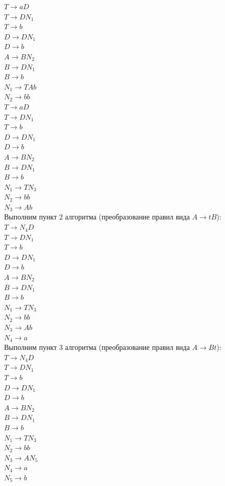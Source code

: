 \documentclass[a4paper,14pt]{extarticle}
\begin{document}
\begin{enumerate}[1.]
$T \rightarrow aD$\\
$T \rightarrow DN_1$\\
$T \rightarrow b$\\
$D \rightarrow DN_1$\\
$D \rightarrow b$\\
$A \rightarrow BN_2$\\
$B \rightarrow DN_1$\\
$B \rightarrow b$\\
$N_1 \rightarrow TAb$\\
$N_2 \rightarrow bb$\\

$T \rightarrow aD$\\
$T \rightarrow DN_1$\\
$T \rightarrow b$\\
$D \rightarrow DN_1$\\
$D \rightarrow b$\\
$A \rightarrow BN_2$\\
$B \rightarrow DN_1$\\
$B \rightarrow b$\\
$N_1 \rightarrow TN_3$\\
$N_2 \rightarrow bb$\\
$N_3 \rightarrow Ab$\\

Выполним пункт 2 алгоритма (преобразование правил вида $A \rightarrow tB$):\\
$T \rightarrow N_4D$\\
$T \rightarrow DN_1$\\
$T \rightarrow b$\\
$D \rightarrow DN_1$\\
$D \rightarrow b$\\
$A \rightarrow BN_2$\\
$B \rightarrow DN_1$\\
$B \rightarrow b$\\
$N_1 \rightarrow TN_3$\\
$N_2 \rightarrow bb$\\
$N_3 \rightarrow Ab$\\
$N_4 \rightarrow a$\\

Выполним пункт 3 алгоритма (преобразование правил вида $A \rightarrow Bt$):\\
$T \rightarrow N_4D$\\
$T \rightarrow DN_1$\\
$T \rightarrow b$\\
$D \rightarrow DN_1$\\
$D \rightarrow b$\\
$A \rightarrow BN_2$\\
$B \rightarrow DN_1$\\
$B \rightarrow b$\\
$N_1 \rightarrow TN_3$\\
$N_2 \rightarrow bb$\\
$N_3 \rightarrow AN_5$\\
$N_4 \rightarrow a$\\
$N_5 \rightarrow b$\\


\end{enumerate}
\end{document}
